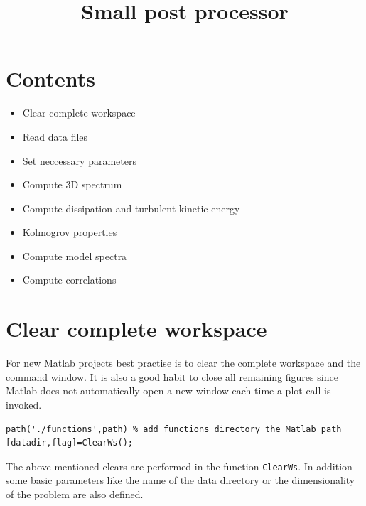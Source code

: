 \documentclass[preprint,12pt,ntfdMod]{elsarticle}
\title{Small post processor}
\begin{document}
\maketitle

    
    
\section{Contents}

\begin{itemize}
\setlength{\itemsep}{-1ex}
   \item Clear complete workspace
   \item Read data files
   \item Set neccessary parameters
   \item Compute 3D spectrum
   \item Compute dissipation and turbulent kinetic energy
   \item Kolmogrov properties
   \item Compute model spectra
   \item Compute correlations
\end{itemize}


\section{Clear complete workspace}

\begin{par}
For new Matlab projects best practise is to clear the complete workspace and the command window. It is also a good habit to close all remaining figures since Matlab does not automatically open a new window each time a plot call is invoked.
\end{par} \vspace{1em}
\begin{lstlisting}
path('./functions',path) % add functions directory the Matlab path
[datadir,flag]=ClearWs();
\end{lstlisting}
\begin{par}

The above mentioned clears are performed in the function \verb|ClearWs|.
In addition some basic parameters like the name of the data
directory or the dimensionality of the problem are also defined.


\end{par} \vspace{1em}
\end{document}
